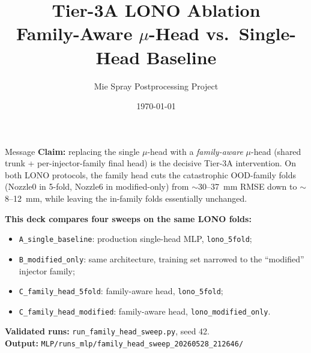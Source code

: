 \documentclass[UTF8,aspectratio=169]{ctexbeamer}
\title[Tier-3A Family-Aware Head]{Tier-3A LONO Ablation\\Family-Aware $\mu$-Head vs.\ Single-Head Baseline}
\author{Mie Spray Postprocessing Project}
\date{\today}
\begin{document}
\begin{frame}
  \titlepage
\end{frame}

\begin{frame}{Message}
\small
\textbf{Claim:} replacing the single $\mu$-head with a \emph{family-aware} $\mu$-head
(shared trunk + per-injector-family final head) is the decisive Tier-3A intervention.
On both LONO protocols, the family head cuts the catastrophic OOD-family folds
(Nozzle0 in 5-fold, Nozzle6 in modified-only) from $\sim$30--37~mm RMSE down to
$\sim$8--12~mm, while leaving the in-family folds essentially unchanged.

\vspace{0.6em}
\textbf{This deck compares four sweeps on the same LONO folds:}
\begin{itemize}\setlength\itemsep{3pt}
  \item \texttt{A\_single\_baseline}: production single-head MLP, \texttt{lono\_5fold};
  \item \texttt{B\_modified\_only}: same architecture, training set narrowed to the
        ``modified'' injector family;
  \item \texttt{C\_family\_head\_5fold}: family-aware head, \texttt{lono\_5fold};
  \item \texttt{C\_family\_head\_modified}: family-aware head, \texttt{lono\_modified\_only}.
\end{itemize}

\vspace{0.6em}
\textbf{Validated runs:} \texttt{run\_family\_head\_sweep.py}, seed 42.\\
\textbf{Output:} \texttt{MLP/runs\_mlp/family\_head\_sweep\_20260528\_212646/}
\end{frame}
\end{document}
